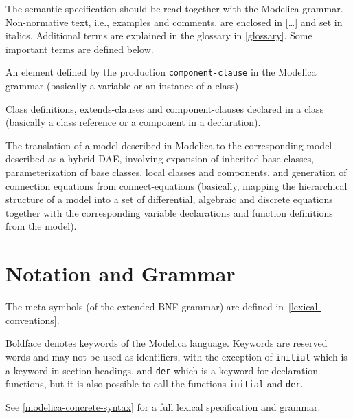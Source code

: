 The semantic specification should be read together with the Modelica grammar.  Non-normative text, i.e., examples and comments, are enclosed in {[}\ldots{]} and set in italics.  Additional terms
are explained in the glossary in \cref{glossary}.  Some important terms are defined below.

\begin{definition}[Component]
An element defined by the production \lstinline!component-clause! in the Modelica grammar (basically a variable or an instance of a class)
\end{definition}

\begin{definition}[Element]
Class definitions, extends-clauses and component-clauses declared in a class (basically a class reference or a component in a declaration).
\end{definition}

\begin{definition}[Flattening]
The translation of a model described in Modelica to the corresponding model described as a hybrid DAE, involving expansion of inherited base classes, parameterization of base classes, local classes
and components, and generation of connection equations from connect-equations (basically, mapping the hierarchical structure of a model into a set of differential, algebraic and discrete equations
together with the corresponding variable declarations and function definitions from the model).
\end{definition}

\section{Notation and Grammar}\label{notation-and-grammar}

The meta symbols (of the extended BNF-grammar) are defined in~\cref{lexical-conventions}.

Boldface denotes keywords of the Modelica language. Keywords are
reserved words and may not be used as identifiers, with the exception of
\lstinline!initial! which is a keyword in section headings, and \lstinline!der! which is a
keyword for declaration functions, but it is also possible to call the
functions \lstinline!initial! and \lstinline!der!.

See \cref{modelica-concrete-syntax} for a full lexical specification and grammar.

